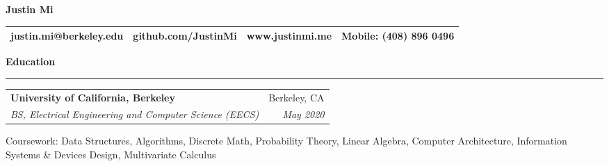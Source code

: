 \documentclass[11pt,letterpaper]{article}
\makeatletter
\newenvironment{topic}[1]
    {
    {\Large \centerline{#1}}
    \vspace*{0.03in}
    \hrule 
    \vspace*{0.05in}
    }
    {}
\newenvironment{event}
    {
    \begin{tabular*}{\textwidth}{l@{\extracolsep{\fill}}r}
    }
    {
    \end{tabular*}
    }
\newenvironment{detail}
    {
    \normalsize
    }
    {
    \vspace*{0.02in}
    }
\newenvironment{head}
    {
    \begin{center}
    \begin{tabular*}{\textwidth}{@{\extracolsep{\fill}} l c c r}
    }
    {
    \hline
    \hline
    \end{tabular*}
    \end{center}
    }
\makeatother
\begin{document}
    \begin{center}
        \huge{\textbf{Justin Mi}}
    \end{center}
    \begin{head}
    justin.mi@berkeley.edu  & github.com/JustinMi & www.justinmi.me & Mobile: (408) 896 0496 \\
    \end{head}








    \begin{topic}{\textbf{Education}}
        \begin{event}
            \textbf{University of California, Berkeley} & Berkeley, CA \\
            \emph{BS, Electrical Engineering and Computer Science (EECS)} & \emph{May 2020}        
        \end{event}
            \begin{detail}
                Coursework: Data Structures, Algorithms, Discrete Math, Probability Theory, Linear Algebra, Computer Architecture, Information Systems \& Devices Design, Multivariate Calculus            
            \end{detail}
    \end{topic} \vspace*{0.1in}
\end{document}
